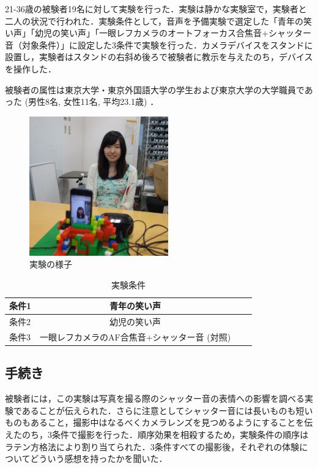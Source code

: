 \documentclass[submit,techreq]{ec2014}
\begin{document}
21-36歳の被験者19名に対して実験を行った．実験は静かな実験室で，実験者と二人の状況で行われた．実験条件として，音声を予備実験で選定した「青年の笑い声」「幼児の笑い声」「一眼レフカメラのオートフォーカス合焦音+シャッター音（対象条件）」に設定した3条件で実験を行った．カメラデバイスをスタンドに設置し，実験者はスタンドの右斜め後ろで被験者に教示を与えたのち，デバイスを操作した．

被験者の属性は東京大学・東京外国語大学の学生および東京大学の大学職員であった (男性8名, 女性11名, 平均23.1歳) ．

\begin{figure}[h!]
  \centering  
\includegraphics[width=60mm, bb=0 0 2312 2312]{images/DSC05173.jpg}
\caption{実験の様子}
  \label{recursive}
\end{figure}

\begin{table}[htb]
  \begin{center}
    \caption{実験条件}
    \begin{tabular}{|l|c|r||r|} \hline
      条件1 & 青年の笑い声 \\ \hline 
      条件2 & 幼児の笑い声 \\ \hline
      条件3 & 一眼レフカメラのAF合焦音+シャッター音 (対照) \\ \hline
    \end{tabular}
    \label{tab:price}
  \end{center}
\end{table}

\subsection{手続き}

被験者には，この実験は写真を撮る際のシャッター音の表情への影響を調べる実験であることが伝えられた．さらに注意としてシャッター音には長いものも短いものもあること，撮影中はなるべくカメラレンズを見つめるようにすることを伝えたのち，3条件で撮影を行った．順序効果を相殺するため，実験条件の順序はラテン方格法により割り当てられた．3条件すべての撮影後，それぞれの体験についてどういう感想を持ったかを聞いた．
\end{document}
